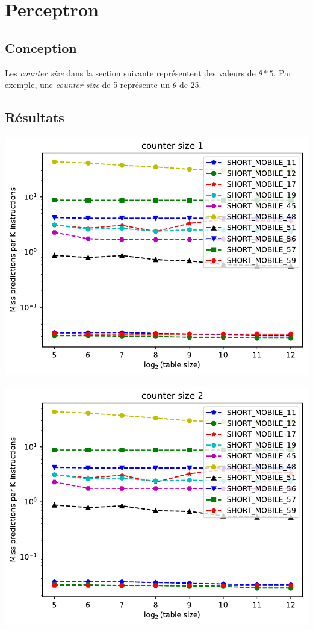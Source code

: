 \documentclass[a4paper]{article}
\begin{document}
\section{Perceptron}
\subsection{Conception}
Les \textit{counter size} dans la section suivante représentent des valeurs de $ \theta * 5 $. Par exemple, une \textit{counter size} de 5 représente un $\theta$ de 25.
\subsection{Résultats}
\begin{minipage}{.48\linewidth}
\includegraphics[width=\linewidth]{perceptron/graph_1}
\end{minipage}%
\hfill
\begin{minipage}{.48\linewidth}
\includegraphics[width=\linewidth]{perceptron/graph_2}
\end{minipage}
\end{document}
